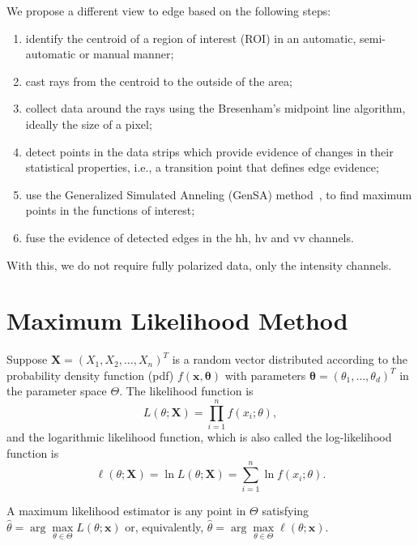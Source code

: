 \documentclass[conference]{IEEEtran}
\begin{document}
We propose a different view to edge based on the following steps:
\begin{enumerate}
	\item identify the centroid of a region of interest (ROI) in an automatic, semi-automatic or manual manner;
	\item cast rays from the centroid to the outside of the area;
	\item collect data around the rays using the  Bresenham's midpoint line algorithm, ideally the size of a pixel;
	\item detect points in the data strips which provide evidence of changes in their statistical properties, i.e., a transition point that defines edge evidence;
	\item use the Generalized Simulated Anneling (GenSA) method~\cite{xgsh}, to find maximum points in the functions of interest;
	\item fuse the evidence of detected edges in the $\text{hh}$, $\text{hv}$ and $\text{vv}$ channels.
\end{enumerate}
With this, we do not require fully polarized data, only the intensity channels.

\section{Maximum Likelihood Method}\label{sec_05}

%
Suppose $\mathbf{X}=(X_1,X_2,\dots,X_n)^T$ is a random vector distributed according to the probability density function (pdf) $f(\mathbf{x},\mathbf{\theta})$ with parameters $\mathbf{\theta}=(\theta_1,\dots,\theta_d)^T$ in the parameter space $\Theta$.
The likelihood function is
\begin{equation*}
    L(\theta;\mathbf{X}) = \prod_{i=1}^{n}f(x_i;\theta),
\end{equation*}
and the logarithmic likelihood function, which is also called the log-likelihood function is
\begin{equation}\label{eq_09}
	\ell(\theta;\mathbf{X})= \ln L(\theta;\mathbf{X}) = \sum_{i=1}^{n}\ln f(x_i;\theta).
\end{equation}

A maximum likelihood estimator is any point in $\Theta$ satisfying $\widehat{\theta}= \arg\max\limits_{\theta\in\Theta}L(\theta;\mathbf{x})$ or, equivalently, $\widehat{\theta}= \arg\max\limits_{\theta\in\Theta}\ell(\theta;\mathbf{x})$.
\end{document}
